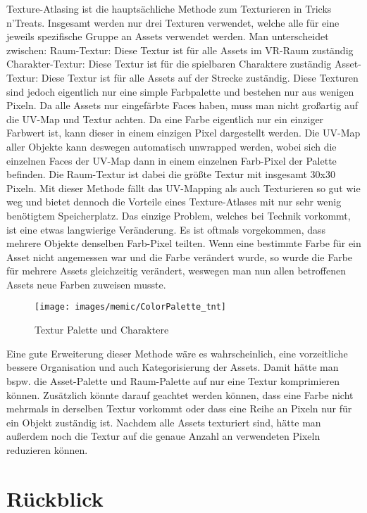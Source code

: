 Texture-Atlasing ist die hauptsächliche Methode zum Texturieren in Tricks n’Treats. Insgesamt werden nur drei Texturen verwendet, welche alle für eine jeweils spezifische Gruppe an Assets verwendet werden. 
Man unterscheidet zwischen:
Raum-Textur: Diese Textur ist für alle Assets im VR-Raum zuständig
Charakter-Textur: Diese Textur ist für die spielbaren Charaktere zuständig
Asset-Textur: Diese Textur ist für alle Assets auf der Strecke zuständig.
Diese Texturen sind jedoch eigentlich nur eine simple Farbpalette und bestehen nur aus wenigen Pixeln. Da alle Assets nur eingefärbte Faces haben, muss man nicht großartig auf die UV-Map und Textur achten. Da eine Farbe eigentlich nur ein einziger Farbwert ist, kann dieser in einem einzigen Pixel dargestellt werden. Die UV-Map aller Objekte kann deswegen automatisch unwrapped werden, wobei sich die einzelnen Faces der UV-Map dann in einem einzelnen Farb-Pixel der Palette befinden. Die Raum-Textur ist dabei die größte Textur mit insgesamt 30x30 Pixeln.
Mit dieser Methode fällt das UV-Mapping als auch Texturieren so gut wie weg und bietet dennoch die Vorteile eines Texture-Atlases mit nur sehr wenig benötigtem Speicherplatz. Das einzige Problem, welches bei Technik vorkommt, ist eine etwas langwierige Veränderung. Es ist oftmals vorgekommen, dass mehrere Objekte denselben Farb-Pixel teilten. Wenn eine bestimmte Farbe für ein Asset nicht angemessen war und die Farbe verändert wurde, so wurde die Farbe für mehrere Assets gleichzeitig verändert, weswegen man nun allen betroffenen Assets neue Farben zuweisen musste.
\begin{figure}[H]
	\centering
	\texttt{[image: images/memic/ColorPalette\_tnt]}
	\caption{Textur Palette und Charaktere}
\end{figure}
Eine gute Erweiterung dieser Methode wäre es wahrscheinlich, eine vorzeitliche bessere Organisation und auch Kategorisierung der Assets. Damit hätte man bspw. die Asset-Palette und Raum-Palette auf nur eine Textur komprimieren können. Zusätzlich könnte darauf geachtet werden können, dass eine Farbe nicht mehrmals in derselben Textur vorkommt oder dass eine Reihe an Pixeln nur für ein Objekt zuständig ist. Nachdem alle Assets texturiert sind, hätte man außerdem noch die Textur auf die genaue Anzahl an verwendeten Pixeln reduzieren können.

\section{Rückblick}

